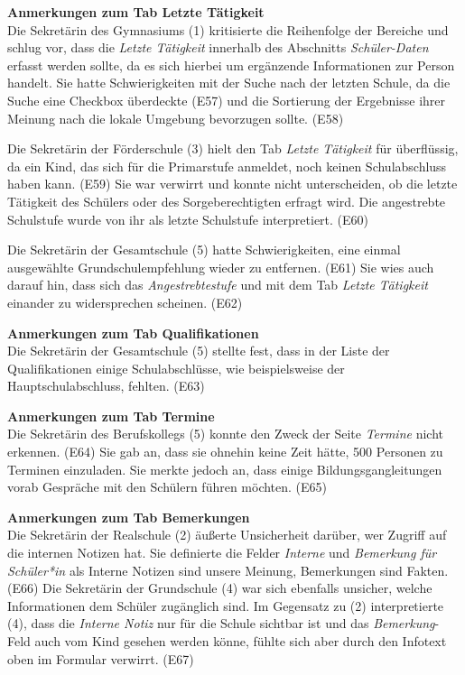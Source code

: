 \textbf{Anmerkungen zum Tab \glqq Letzte Tätigkeit\grqq{}}\\
Die Sekretärin des Gymnasiums (1) kritisierte die Reihenfolge der Bereiche und schlug vor, dass die \textit{Letzte Tätigkeit} innerhalb des Abschnitts \textit{Schüler-Daten} erfasst werden sollte, da es sich hierbei um ergänzende Informationen zur Person handelt. Sie hatte Schwierigkeiten mit der Suche nach der letzten Schule, da die Suche eine Checkbox überdeckte (E57) und die Sortierung der Ergebnisse ihrer Meinung nach die lokale Umgebung bevorzugen sollte. (E58)

Die Sekretärin der Förderschule (3) hielt den Tab \textit{Letzte Tätigkeit} für überflüssig, da ein Kind, das sich für die Primarstufe anmeldet, noch keinen Schulabschluss haben kann. (E59) Sie war verwirrt und konnte nicht unterscheiden, ob die letzte Tätigkeit des Schülers oder des Sorgeberechtigten erfragt wird. Die angestrebte Schulstufe wurde von ihr als letzte Schulstufe interpretiert. (E60)

Die Sekretärin der Gesamtschule (5) hatte Schwierigkeiten, eine einmal ausgewählte Grundschulempfehlung wieder zu entfernen. (E61) Sie wies auch darauf hin, dass sich das \textit{Angestrebtestufe} und mit dem Tab \textit{Letzte Tätigkeit} einander zu widersprechen scheinen. (E62)

\textbf{Anmerkungen zum Tab \glqq Qualifikationen\grqq{}}\\
Die Sekretärin der Gesamtschule (5) stellte fest, dass in der Liste der Qualifikationen einige Schulabschlüsse, wie beispielsweise der Hauptschulabschluss, fehlten. (E63) 

\textbf{Anmerkungen zum Tab \glqq Termine\grqq{}}\\
Die Sekretärin des Berufskollegs (5) konnte den Zweck der Seite \textit{Termine} nicht erkennen. (E64) Sie gab an, dass sie ohnehin keine Zeit hätte, 500 Personen zu Terminen einzuladen. Sie merkte jedoch an, dass einige Bildungsgangleitungen vorab Gespräche mit den Schülern führen möchten. (E65)

\textbf{Anmerkungen zum Tab \glqq Bemerkungen\grqq{}}\\
Die Sekretärin der Realschule (2) äußerte Unsicherheit darüber, wer Zugriff auf die internen Notizen hat. Sie definierte die Felder \textit{Interne} und \textit{Bemerkung für Schüler*in} als \glqq Interne Notizen sind unsere Meinung, Bemerkungen sind Fakten\grqq{}. (E66) Die Sekretärin der Grundschule (4) war sich ebenfalls unsicher, welche Informationen dem Schüler zugänglich sind. Im Gegensatz zu (2) interpretierte (4), dass die \textit{Interne Notiz} nur für die Schule sichtbar ist und das \textit{Bemerkung}-Feld auch vom Kind gesehen werden könne, fühlte sich aber durch den Infotext oben im Formular verwirrt. (E67)


